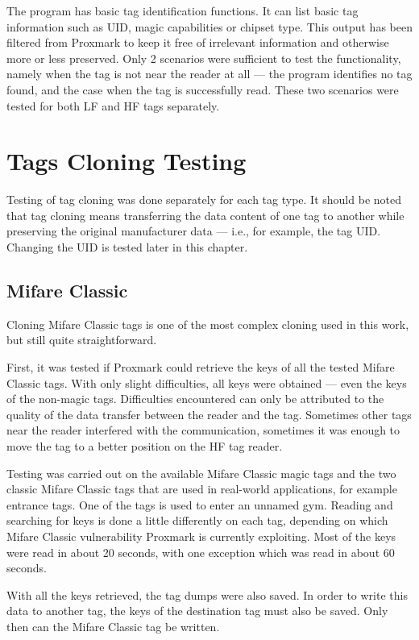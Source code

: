 The program has basic tag identification functions. It can list basic tag information such as UID, magic capabilities or chipset type. This output has been filtered from Proxmark to keep it free of irrelevant information and otherwise more or less preserved. Only 2 scenarios were sufficient to test the functionality, namely when the tag is not near the reader at all --- the program identifies no tag found, and the case when the tag is successfully read. These two scenarios were tested for both LF and HF tags separately.

\section{Tags Cloning Testing}
Testing of tag cloning was done separately for each tag type. It should be noted that tag cloning means transferring the data content of one tag to another while preserving the original manufacturer data --- i.e., for example, the tag UID. Changing the UID is tested later in this chapter.

\subsection{Mifare Classic}
\label{subsec:mifareclassiccloning}

Cloning Mifare Classic tags is one of the most complex cloning used in this work, but still quite straightforward. 

First, it was tested if Proxmark could retrieve the keys of all the tested Mifare Classic tags. With only slight difficulties, all keys were obtained --- even the keys of the non-magic tags. Difficulties encountered can only be attributed to the quality of the data transfer between the reader and the tag. Sometimes other tags near the reader interfered with the communication, sometimes it was enough to move the tag to a better position on the HF tag reader.

Testing was carried out on the available Mifare Classic magic tags and the two classic Mifare Classic tags that are used in real-world applications, for example entrance tags. One of the tags is used to enter an unnamed gym. Reading and searching for keys is done a little differently on each tag, depending on which Mifare Classic vulnerability Proxmark is currently exploiting. Most of the keys were read in about 20 seconds, with one exception which was read in about 60 seconds.

With all the keys retrieved, the tag dumps were also saved. In order to write this data to another tag, the keys of the destination tag must also be saved. Only then can the Mifare Classic tag be written.

